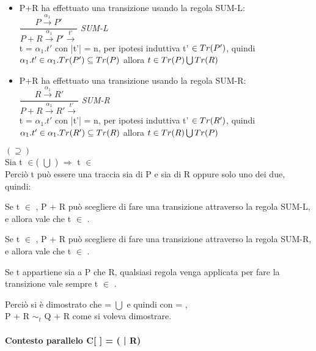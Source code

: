 \begin{itemize}
	\item P+R ha effettuato una transizione usando la regola SUM-L:\\
	
	 	$\dfrac{P \overset{\alpha_{1}}\rightarrow P'}{P + R \overset{\alpha_{1}}\rightarrow P'\overset{t'}\rightarrow}$ \textit{SUM-L} \\
	 	
	 	t = $\alpha_{1}.t'$ con |t'| = n, per ipotesi induttiva t' $\in Tr(P')$, quindi 
	 	$\alpha_{1}.t' \in \alpha_{1}.Tr(P')\subseteq Tr(P) $ allora $t \in Tr(P) \bigcup Tr(R)$
	 	\\
	 	
	 \item P+R ha effettuato una transizione usando la regola SUM-R:\\
	 
	 $\dfrac{R \overset{\alpha_{1}}\rightarrow R'}{P + R \overset{\alpha_{1}}\rightarrow R'\overset{t'}\rightarrow}$ \textit{SUM-R} \\
	 
		t = $\alpha_{1}.t'$ con |t'| = n, per ipotesi induttiva t' $\in Tr(R')$, quindi 
	$\alpha_{1}.t' \in \alpha_{1}.Tr(R')\subseteq Tr(R) $ allora $t \in Tr(R) \bigcup Tr(P)$
	\\
	 	
\end{itemize}

$(\supseteq)$\\

Sia t $\in$( $\bigcup$ ) $\Rightarrow $  t $\in$\\
Perciò t può essere una traccia sia di P e sia di R oppure solo uno dei due, quindi:

Se t $\in$ , P + R può scegliere di fare una transizione attraverso la regola SUM-L, e allora vale che t $\in$ .

Se t $\in$ , P + R può scegliere di fare una transizione attraverso la regola SUM-R, e allora vale che t $\in$ .

Se t appartiene sia a P che R, qualsiasi regola venga applicata per fare la transizione vale sempre t $\in$ .

Perciò si è dimostrato che  =  $\bigcup$  e quindi con  = ,\\ P + R $\sim_{t}$ Q + R come si voleva dimostrare.

\paragraph{Contesto parallelo  C[ ] = (\hspace{0.3cm} | R)} \mbox{}

